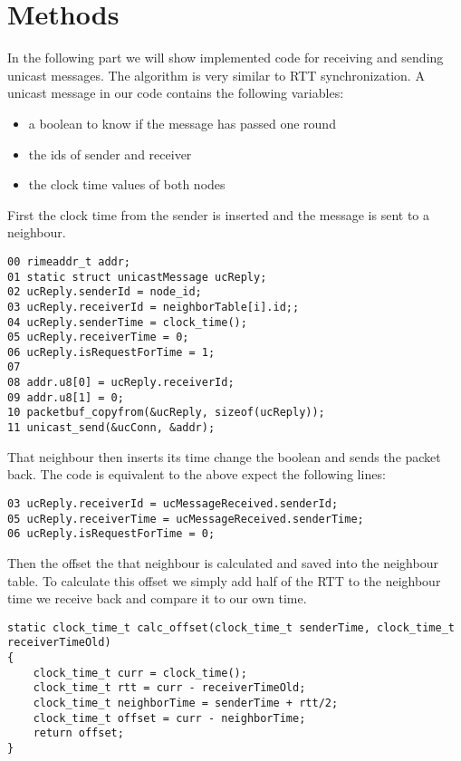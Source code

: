 \documentclass{llncs}
\begin{document}
\section{Methods}
In the following part we will show implemented code for receiving and sending unicast messages. The algorithm is very similar to RTT synchronization. A unicast message in our code contains the following variables:
\begin{itemize}
	\item a boolean to know if the message has passed one round
	\item the ids of sender and receiver
	\item the clock time values of both nodes
\end{itemize}
First the clock time from the sender is inserted and the message is sent to a neighbour. 
\begin{lstlisting}
00 rimeaddr_t addr;
01 static struct unicastMessage ucReply;
02 ucReply.senderId = node_id;
03 ucReply.receiverId = neighborTable[i].id;;
04 ucReply.senderTime = clock_time();
05 ucReply.receiverTime = 0;
06 ucReply.isRequestForTime = 1;
07 
08 addr.u8[0] = ucReply.receiverId;
09 addr.u8[1] = 0;
10 packetbuf_copyfrom(&ucReply, sizeof(ucReply));
11 unicast_send(&ucConn, &addr);
\end{lstlisting}

That neighbour then inserts its time change the boolean and sends the packet back. The code is equivalent to the above expect the following lines:

\begin{lstlisting}
03 ucReply.receiverId = ucMessageReceived.senderId;
05 ucReply.receiverTime = ucMessageReceived.senderTime;
06 ucReply.isRequestForTime = 0;
\end{lstlisting}


 Then the offset the that neighbour is calculated and saved into the neighbour table. To calculate this offset we simply add half of the RTT to the neighbour time we receive back and compare it to our own time. 

\begin{lstlisting}
static clock_time_t calc_offset(clock_time_t senderTime, clock_time_t receiverTimeOld)
{
    clock_time_t curr = clock_time();
    clock_time_t rtt = curr - receiverTimeOld;
    clock_time_t neighborTime = senderTime + rtt/2;
    clock_time_t offset = curr - neighborTime;
    return offset;
}
\end{lstlisting}

\begin{comment}
Experimental setup/Measurement procedure: The experimental setup, the
differences of the experimental series, the different parameters used, including local
sensor setup and TARWIS testbed.
\end{comment}
\end{document}
